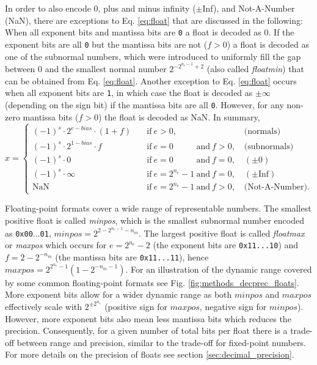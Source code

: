 In order to also encode 0, plus and minus infinity ($\pm$Inf), and Not-A-Number (NaN), there are exceptions to Eq. \ref{eq:float} that
are discussed in the following: When all exponent bits and mantissa bits are \texttt{0} a float is decoded as 0. If the exponent bits are
all \texttt{0} but the mantissa bits are not ($f>0$) a float is decoded as one of the subnormal numbers, which were introduced to uniformly
fill the gap between 0 and the smallest normal number $2^{-2^{n_e-1}+2}$ (also called \emph{floatmin}) that can be obtained from
Eq. \ref{eq:float}. Another exception to Eq. \ref{eq:float} occurs when all exponent bits are \texttt{1}, in which case the float is decoded
as $\pm \infty$ (depending on the sign bit) if the mantissa bits are all \texttt{0}. However, for any non-zero mantissa bits ($f>0$) the float is
decoded as NaN. In summary,
\begin{equation}
x = \begin{cases}
(-1)^s \cdot 2^{e-bias} \cdot (1+f) \quad &\text{if}~e > 0,\phantom{^{n_e}-1~\text{and}~f > 0} \quad \text{(normals)} \\
(-1)^s \cdot 2^{1-bias} \cdot f \quad &\text{if}~e=0\phantom{^{n_e}-1}~\text{and}~f > 0, \quad \text{(subnormals)} \\
(-1)^s \cdot 0 \quad &\text{if}~e=0\phantom{^{n_e}-1}~\text{and}~f = 0, \quad (\pm 0) \\
(-1)^s \cdot \infty \quad &\text{if}~e=2^{n_e}-1~\text{and}~f = 0, \quad (\pm \text{Inf}) \\
\text{NaN} \quad &\text{if}~e=2^{n_e}-1~\text{and}~f > 0, \quad \text{(Not-A-Number).}
\end{cases}
\label{eq:float_all}
\end{equation}

Floating-point formats cover a wide range of representable numbers. The smallest positive float is called \emph{minpos}, which is the
smallest subnormal number encoded as \texttt{0x00$\dots$01}, $minpos = 2^{2-2^{n_e - 1}-n_m}$. The largest positive float is called
\emph{floatmax} or \emph{maxpos} which occurs for $e=2^{n_e}-2$ (the exponent bits are \texttt{0x11...10}) and 
$f=2-2^{-n_m}$ (the mantissa bits are \texttt{0x11...11}), hence $maxpos = 2^{2^{n_e}-1}\left(1-2^{-n_m-1}\right)$. For an illustration 
of the dynamic range covered by some common floating-point formats see Fig. \ref{fig:methods_decprec_floats}. More exponent
bits allow for a wider dynamic range as both $minpos$ and $maxpos$ effectively scale with $2^{\pm2^{n_e}}$ (positive sign for $maxpos$,
negative sign for $minpos$). However, more exponent bits also mean less mantissa bits which reduces the precision. Consequently,
for a given number of total bits per float there is a trade-off between range and precision, similar to the trade-off for fixed-point numbers.
For more details on the precision of floats see section \ref{sec:decimal_precision}.

